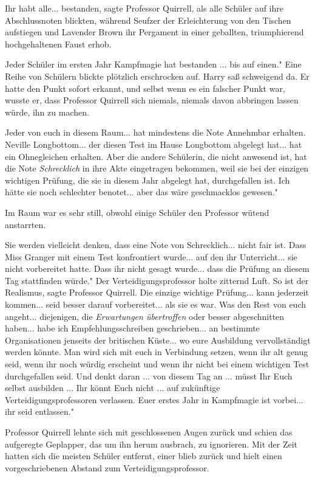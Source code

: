 \glqq{}Ihr habt alle... bestanden\grqq{}, sagte Professor Quirrell, als alle
Schüler auf ihre Abschlussnoten blickten, während Seufzer der Erleichterung von
den Tischen aufstiegen und Lavender Brown ihr Pergament in einer geballten,
triumphierend hochgehaltenen Faust erhob.

\glqq{}Jeder Schüler im ersten Jahr Kampfmagie hat bestanden ... bis auf einen."
Eine Reihe von Schülern blickte plötzlich erschrocken auf. Harry saß schweigend
da. Er hatte den Punkt sofort erkannt, und selbst wenn es ein falscher Punkt
war, wusste er, dass Professor Quirrell sich niemals, niemals davon abbringen
lassen würde, ihn zu machen.

\glqq{}Jeder von euch in diesem Raum... hat mindestens die Note Annehmbar
erhalten. Neville Longbottom... der diesen Test im Hause Longbottom abgelegt
hat... hat ein Ohnegleichen erhalten. Aber die andere Schülerin, die nicht
anwesend ist, hat die Note \glqq{}\emph{Schrecklich}\grqq{} in ihre Akte
eingetragen bekommen, weil sie bei der einzigen wichtigen Prüfung, die sie in
diesem Jahr abgelegt hat, durchgefallen ist. Ich hätte sie noch schlechter
benotet... aber das wäre geschmacklos gewesen."

Im Raum war es sehr still, obwohl einige Schüler den Professor wütend
anstarrten.

\glqq{}Sie werden vielleicht denken, dass eine Note von Schrecklich... nicht fair
ist. Dass Miss Granger mit einem Test konfrontiert wurde... auf den ihr
Unterricht... sie nicht vorbereitet hatte. Dass ihr nicht gesagt wurde... dass
die Prüfung an diesem Tag stattfinden würde." Der Verteidigungsprofessor holte
zitternd Luft. \glqq{}So ist der Realismus\grqq{}, sagte Professor Quirrell.
\glqq{}Die einzige wichtige Prüfung... kann jederzeit kommen... seid besser
darauf vorbereitet... als sie es war. Was den Rest von euch angeht...
diejenigen, die \emph{Erwartungen übertroffen} oder besser abgeschnitten
haben... habe ich Empfehlungsschreiben geschrieben... an bestimmte
Organisationen jenseits der britischen Küste... wo eure Ausbildung
vervollständigt werden könnte. Man wird sich mit euch in Verbindung setzen, wenn
ihr alt genug seid, wenn ihr noch würdig erscheint und wenn ihr nicht bei einem
wichtigen Test durchgefallen seid. Und denkt daran ... von diesem Tag an ...
müsst Ihr Euch selbst ausbilden ... Ihr könnt Euch nicht ... auf zukünftige
Verteidigungsprofessoren verlassen. Euer erstes Jahr in Kampfmagie ist vorbei...
ihr seid entlassen."

Professor Quirrell lehnte sich mit geschlossenen Augen zurück und schien das
aufgeregte Geplapper, das um ihn herum ausbrach, zu ignorieren. Mit der Zeit
hatten sich die meisten Schüler entfernt, einer blieb zurück und hielt einen
vorgeschriebenen Abstand zum Verteidigungsprofessor.

